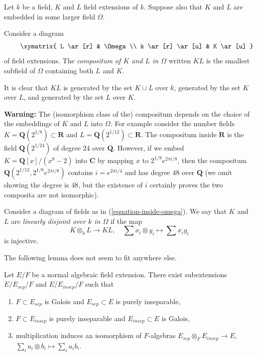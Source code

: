\noindent
Let $k$ be a field, $K$ and $L$ field extensions of $k$.
Suppose also that $K$ and $L$ are embedded in some larger field $\Omega$.

\begin{definition}
\label{definition-compositum}
Consider a diagram
\begin{equation}
\label{equation-inside-omega}
\vcenter{
\xymatrix{
L \ar[r] & \Omega \\
k \ar[r] \ar[u] & K \ar[u]
}
}
\end{equation}
of field extensions. The {\it compositum of $K$ and $L$ in $\Omega$}
written $KL$ is the smallest subfield of $\Omega$ containing both
$L$ and $K$.
\end{definition}

\noindent
It is clear that $KL$ is generated by the set $K \cup L$ over $k$,
generated by the set $K$ over $L$, and generated by the set $L$ over $K$.

\medskip\noindent
{\bf Warning:} The (isomorphism class of the) compositum depends on
the choice of the embeddings of $K$ and $L$ into $\Omega$. For example
consider the number fields $K = \mathbf{Q}(2^{1/8}) \subset \mathbf{R}$ and
$L = \mathbf{Q}(2^{1/12}) \subset \mathbf{R}$. The compositum inside
$\mathbf{R}$ is the field $\mathbf{Q}(2^{1/24})$ of degree $24$ over
$\mathbf{Q}$. However, if we embed $K = \mathbf{Q}[x]/(x^8 - 2)$ into
$\mathbf{C}$ by mapping $x$ to $2^{1/8}e^{2\pi i/8}$, then the compositum
$\mathbf{Q}(2^{1/12}, 2^{1/8}e^{2\pi i/8})$ contains $i = e^{2\pi i/4}$ and has
degree $48$ over $\mathbf{Q}$ (we omit showing the degree is $48$, but
the existence of $i$ certainly proves the two composita are not isomorphic).

\begin{definition}
\label{definition-linearly-disjoint}
Consider a diagram of fields as in (\ref{equation-inside-omega}).
We say that $K$ and $L$ are {\it linearly disjoint over $k$ in $\Omega$}
if the map
$$
K \otimes_k L \longrightarrow KL,\quad
\sum x_i \otimes y_i \longmapsto \sum x_i y_i
$$
is injective.
\end{definition}

\noindent
The following lemma does not seem to fit anywhere else.

\begin{lemma}
\label{lemma-normal-case}
Let $E/F$ be a normal algebraic field extension. There exist subextensions
$E / E_{sep} /F$ and $E / E_{insep} / F$ such that
\begin{enumerate}
\item $F \subset E_{sep}$ is Galois and $E_{sep} \subset E$
is purely inseparable,
\item $F \subset E_{insep}$ is purely inseparable and $E_{insep} \subset E$
is Galois,
\item multiplication induces an isomorphism of $F$-algebras
$E_{sep}\otimes_F E_{insep}\longrightarrow E$,
$\sum_i a_i\otimes b_i\longmapsto\sum_i a_i b_i$.
\end{enumerate}
\end{lemma}

